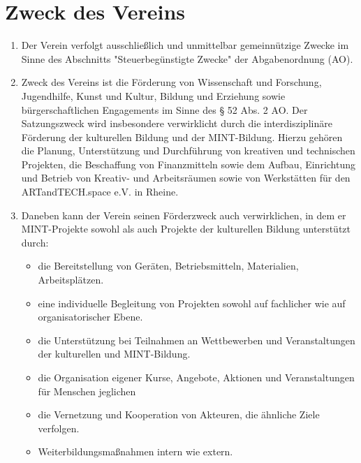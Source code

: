 \documentclass[12pt]{article}
\begin{document}
\section{Zweck des Vereins}

\begin{enumerate}[label=(\arabic*)]
	\item Der Verein verfolgt ausschließlich und unmittelbar gemeinnützige Zwecke im Sinne des
	      Abschnitts "Steuerbegünstigte Zwecke" der Abgabenordnung (AO).
	\item Zweck des Vereins ist die Förderung von Wissenschaft und Forschung, Jugendhilfe, Kunst und
	      Kultur, Bildung und Erziehung sowie bürgerschaftlichen Engagements im Sinne des § 52 Abs. 2 AO.
	      Der Satzungszweck wird insbesondere verwirklicht durch die interdisziplinäre Förderung der
	      kulturellen Bildung und der MINT-Bildung. Hierzu gehören die Planung, Unterstützung und
	      Durchführung von kreativen und technischen Projekten, die Beschaffung von Finanzmitteln sowie
	      dem Aufbau, Einrichtung und Betrieb von Kreativ- und Arbeitsräumen sowie von Werkstätten für den
	      ARTandTECH.space e.V. in Rheine.
	\item Daneben kann der Verein seinen Förderzweck auch verwirklichen, in dem er MINT-Projekte
	      sowohl als auch Projekte der kulturellen Bildung unterstützt durch:
	      \begin{itemize}
		      \item die Bereitstellung von Geräten, Betriebsmitteln, Materialien, Arbeitsplätzen.
		      \item eine individuelle Begleitung von Projekten sowohl auf fachlicher wie auf organisatorischer Ebene.
		      \item die Unterstützung bei Teilnahmen an Wettbewerben und Veranstaltungen der kulturellen und
		            MINT-Bildung.
		      \item die Organisation eigener Kurse, Angebote, Aktionen und Veranstaltungen für Menschen jeglichen
		      \item die Vernetzung und Kooperation von Akteuren, die ähnliche Ziele verfolgen.
		      \item Weiterbildungsmaßnahmen intern wie extern.
	      \end{itemize}

\end{enumerate}
\end{document}
